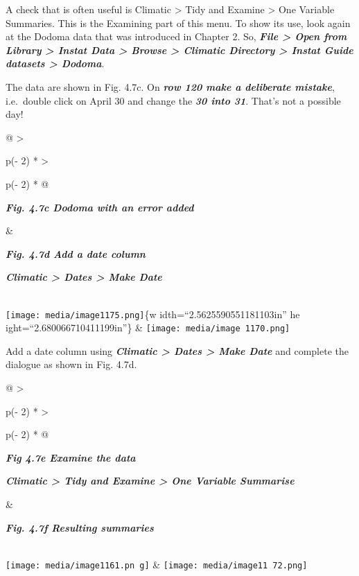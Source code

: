 \documentclass[
  letterpaper,
  DIV=11,
  numbers=noendperiod]{scrreprt}
\begin{document}
A check that is often useful is Climatic \textgreater{} Tidy and Examine
\textgreater{} One Variable Summaries. This is the Examining part of
this menu. To show its use, look again at the Dodoma data that was
introduced in Chapter 2. So, \textbf{\emph{File \textgreater{} Open from
Library \textgreater{} Instat Data \textgreater{} Browse \textgreater{}
Climatic Directory \textgreater{} Instat Guide datasets \textgreater{}
Dodoma}}.

The data are shown in Fig. 4.7c. On \textbf{\emph{row 120 make a
deliberate mistake}}, i.e.~double click on April 30 and change the
\textbf{\emph{30 into 31}}. That's not a possible day!

\begin{longtable}[]{@{}
  >{\raggedright\arraybackslash}p{(\columnwidth - 2\tabcolsep) * }
  >{\raggedright\arraybackslash}p{(\columnwidth - 2\tabcolsep) * }@{}}
\toprule\noalign{}
\begin{minipage}[b]{\linewidth}\raggedright
\textbf{\emph{Fig. 4.7c Dodoma with an error added}}
\end{minipage} & \begin{minipage}[b]{\linewidth}\raggedright
\textbf{\emph{Fig. 4.7d Add a date column}}

\textbf{\emph{Climatic \textgreater{} Dates \textgreater{} Make Date}}
\end{minipage} \\
\midrule\noalign{}
\endhead
\bottomrule\noalign{}
\endlastfoot
\texttt{[image: media/image1175.png]}\{w idth=``2.5625590551181103in''
he ight=``2.680066710411199in''\} &
\texttt{[image: media/image 1170.png]} \\
\end{longtable}

Add a date column using \textbf{\emph{Climatic \textgreater{} Dates
\textgreater{} Make Date}} and complete the dialogue as shown in Fig.
4.7d.

\begin{longtable}[]{@{}
  >{\raggedright\arraybackslash}p{(\columnwidth - 2\tabcolsep) * }
  >{\raggedright\arraybackslash}p{(\columnwidth - 2\tabcolsep) * }@{}}
\toprule\noalign{}
\begin{minipage}[b]{\linewidth}\raggedright
\textbf{\emph{Fig 4.7e Examine the data}}

\textbf{\emph{Climatic \textgreater{} Tidy and Examine \textgreater{}
One Variable Summarise}}
\end{minipage} & \begin{minipage}[b]{\linewidth}\raggedright
\textbf{\emph{Fig. 4.7f Resulting summaries}}
\end{minipage} \\
\midrule\noalign{}
\endhead
\bottomrule\noalign{}
\endlastfoot
\texttt{[image: media/image1161.pn g]}
&
\texttt{[image: media/image11 72.png]} \\
\end{longtable}
\end{document}
